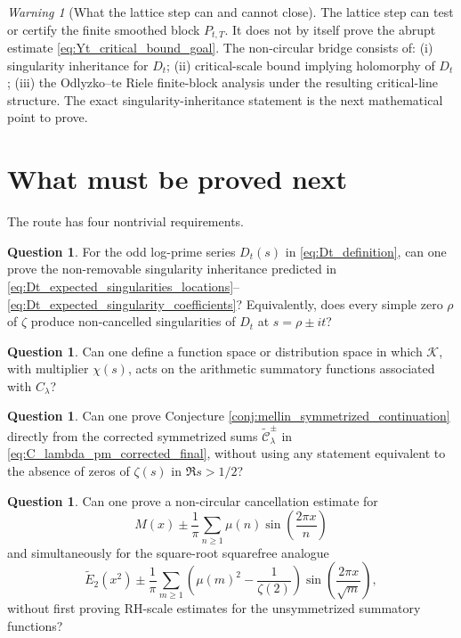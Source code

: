 \documentclass[11pt]{amsart}
\numberwithin{equation}{section}
\theoremstyle{plain}
\theoremstyle{definition}
\newtheorem{question}[theorem]{Question}
\theoremstyle{remark}
\newtheorem{warning}[theorem]{Warning}
\begin{document}
\begin{warning}[What the lattice step can and cannot close]
\label{warn:Yt_lattice_scope}
The lattice step can test or certify the finite smoothed block \(P_{t,T}\).  It does not by itself prove the abrupt estimate \eqref{eq:Yt_critical_bound_goal}.  The non-circular bridge consists of: (i) singularity inheritance for \(D_t\); (ii) critical-scale bound implying holomorphy of \(D_t\); (iii) the Odlyzko--te Riele finite-block analysis under the resulting critical-line structure.  The exact singularity-inheritance statement is the next mathematical point to prove.
\end{warning}


\section{What must be proved next}
\label{sec:what_must_be_proved_next}

The route has four nontrivial requirements.


\begin{question}
\label{ques:odd_log_prime_singularity_inheritance}
For the odd log-prime series \(D_t(s)\) in \eqref{eq:Dt_definition}, can one prove the non-removable singularity inheritance predicted in \eqref{eq:Dt_expected_singularities_locations}--\eqref{eq:Dt_expected_singularity_coefficients}?  Equivalently, does every simple zero \(\rho\) of \(\zeta\) produce non-cancelled singularities of \(D_t\) at \(s=\rho\pm it\)?
\end{question}

\begin{question}
\label{ques:function_space_for_K}
Can one define a function space or distribution space in which \(\mathcal K\), with multiplier \(\chi(s)\), acts on the arithmetic summatory functions associated with \(C_\lambda\)?
\end{question}

\begin{question}
\label{ques:mellin_continuation_without_RH}
Can one prove Conjecture \ref{conj:mellin_symmetrized_continuation} directly from the corrected symmetrized sums \(\widetilde{\mathcal C}_\lambda^{\pm}\) in \eqref{eq:C_lambda_pm_corrected_final}, without using any statement equivalent to the absence of zeros of \(\zeta(s)\) in \(\Re s>1/2\)?
\end{question}

\begin{question}
\label{ques:reciprocal_sine_cancellation}
Can one prove a non-circular cancellation estimate for
\begin{equation}
M(x)\pm\frac1\pi\sum_{n\ge1}\mu(n)\sin\left(\frac{2\pi x}{n}\right)
\label{eq:question_mertens_reciprocal_sine}
\end{equation}
and simultaneously for the square-root squarefree analogue
\begin{equation}
\widetilde E_2(x^2)\pm\frac1\pi\sum_{m\ge1}\left(\mu(m)^2-\frac1{\zeta(2)}\right)
\sin\left(\frac{2\pi x}{\sqrt m}\right),
\label{eq:question_squarefree_sqrt_reciprocal_sine}
\end{equation}
without first proving RH-scale estimates for the unsymmetrized summatory functions?
\end{question}
\end{document}
